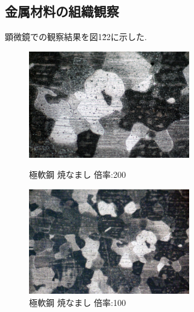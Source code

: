 \documentclass[10pt，a4j]{jsarticle}
\begin{document}
  \subsection{金属材料の組織観察}
  顕微鏡での観察結果を図1\~22に示した.
  \begin{figure}[htbp]  
    \begin{minipage}{0.5\hsize}
      \begin{center}
        \includegraphics[width=7cm]{../img/gokunankou_yakinamashi_200.png}
        \caption{極軟鋼 焼なまし 倍率:200}
      \end{center}
    \end{minipage}
    \begin{minipage}{0.5\hsize}
      \begin{center}
        \includegraphics[width=7cm]{../img/gokunankou_yakinamashi_100.png}
        \caption{極軟鋼 焼なまし 倍率:100}
      \end{center}
    \end{minipage}
  \end{figure}
\end{document}
